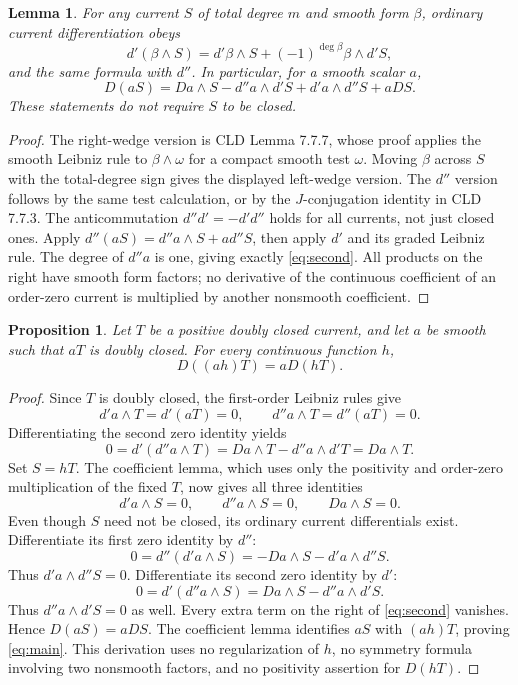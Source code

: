 \documentclass[11pt]{article}
\newtheorem{lemma}[theorem]{Lemma}
\newtheorem{proposition}[theorem]{Proposition}
\newcommand{\dp}{d'}
\newcommand{\ddp}{d''}
\begin{document}
\begin{lemma}\label{lem:leibniz}
For any current $S$ of total degree $m$ and smooth form $\beta$,
ordinary current differentiation obeys
\[
 \dp(\beta\wedge S)=\dp\beta\wedge S+
                 (-1)^{\deg\beta}\beta\wedge\dp S,
\]
and the same formula with $\ddp$. In particular, for a smooth scalar $a$,
\begin{equation}\label{eq:second}
 D(aS)=Da\wedge S-\ddp a\wedge\dp S
                    +\dp a\wedge\ddp S+aDS.
\end{equation}
These statements do not require $S$ to be closed.
\end{lemma}
\begin{proof}
The right-wedge version is CLD Lemma 7.7.7, whose proof applies the smooth
Leibniz rule to $\beta\wedge\omega$ for a compact smooth test $\omega$.
Moving $\beta$ across $S$ with the total-degree sign gives the displayed
left-wedge version. The $\ddp$ version follows by the same test calculation,
or by the $J$-conjugation identity in CLD 7.7.3. The anticommutation
$\ddp\dp=-\dp\ddp$ holds for all currents, not just closed ones.
Apply $\ddp(aS)=\ddp a\wedge S+a\ddp S$, then apply $\dp$ and its
graded Leibniz rule. The degree of $\ddp a$ is one, giving exactly
\eqref{eq:second}. All products on the right have smooth form factors;
no derivative of the continuous coefficient of an order-zero current is
multiplied by another nonsmooth coefficient.
\end{proof}

\begin{proposition}\label{prop:identity}
Let $T$ be a positive doubly closed current, and let $a$ be smooth such
that $aT$ is doubly closed. For every continuous function $h$,
\begin{equation}\label{eq:main}
 D((ah)T)=aD(hT).
\end{equation}
\end{proposition}
\begin{proof}
Since $T$ is doubly closed, the first-order Leibniz rules give
\[
 \dp a\wedge T=\dp(aT)=0,
 \qquad \ddp a\wedge T=\ddp(aT)=0.
\]
Differentiating the second zero identity yields
\[
 0=\dp(\ddp a\wedge T)=Da\wedge T-\ddp a\wedge\dp T
   =Da\wedge T.
\]
Set $S=hT$. The coefficient lemma, which uses only the positivity and
order-zero multiplication of the fixed $T$, now gives all three identities
\[
 \dp a\wedge S=0,\qquad \ddp a\wedge S=0,
 \qquad Da\wedge S=0.
\]
Even though $S$ need not be closed, its ordinary current differentials
exist. Differentiate its first zero identity by $\ddp$:
\[
 0=\ddp(\dp a\wedge S)
  =-Da\wedge S-\dp a\wedge\ddp S.
\]
Thus $\dp a\wedge\ddp S=0$. Differentiate its second zero identity
by $\dp$:
\[
 0=\dp(\ddp a\wedge S)
  =Da\wedge S-\ddp a\wedge\dp S.
\]
Thus $\ddp a\wedge\dp S=0$ as well. Every extra term on the right of
\eqref{eq:second} vanishes. Hence $D(aS)=aDS$. The coefficient lemma
identifies $aS$ with $(ah)T$, proving \eqref{eq:main}. This derivation
uses no regularization of $h$, no symmetry formula involving two
nonsmooth factors, and no positivity assertion for $D(hT)$.
\end{proof}
\end{document}
